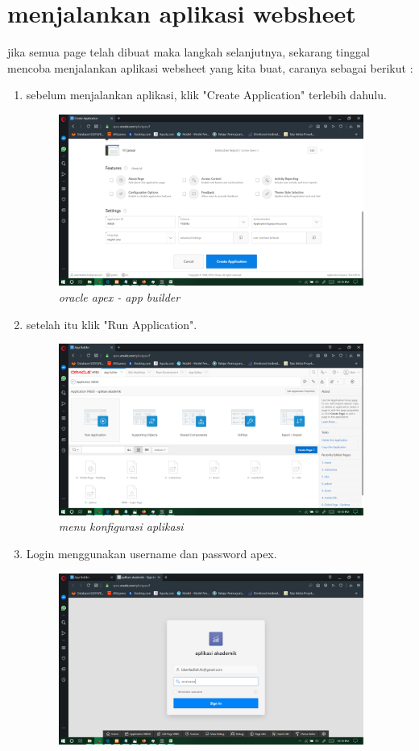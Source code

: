\documentclass[12pt]{ociamthesis}  %
\begin{document}
\section{menjalankan aplikasi websheet}
jika semua page telah dibuat maka langkah selanjutnya, sekarang tinggal mencoba menjalankan aplikasi websheet yang kita buat, caranya sebagai berikut :
\begin{enumerate}
	\item sebelum menjalankan aplikasi, klik "Create Application" terlebih dahulu.
	\begin{figure}[H]
    \centering
	\includegraphics[width=10cm]{figures/run app/Screenshot (247).png} 
    \caption{\textit{oracle apex - app builder}}
    \label{foto21}
 	\end{figure}
	\item setelah itu klik "Run Application".
	\begin{figure}[H]
    \centering
	\includegraphics[width=10cm]{figures/run app/Screenshot (248).png} 
    \caption{\textit{menu konfigurasi aplikasi}}
    \label{foto21}
 	\end{figure}
	\item Login menggunakan username dan password apex.
	\begin{figure}[H]
    \centering
	\includegraphics[width=10cm]{figures/run app/Screenshot (249).png} 

\end{figure}
\end{enumerate}
\end{document}
